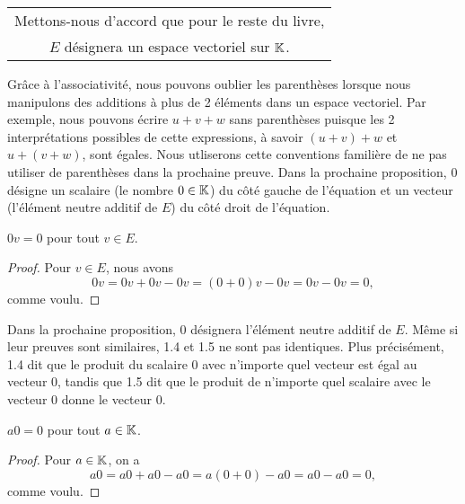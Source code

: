 \documentclass[12pt]{book}
\theoremstyle{plain}
\begin{document}
\begin{center}
    \begin{tabular}{|c|}
        \hline
        Mettons-nous d'accord que pour le reste du livre,   \\
        $E$ désignera un espace vectoriel sur $\mathbb{K}$.   \\
        \hline
    \end{tabular}
\end{center}

Grâce à l'associativité, nous pouvons oublier les parenthèses lorsque nous manipulons des additions à plus de 2 éléments dans un espace vectoriel. Par exemple, nous pouvons écrire $u+v+w$ sans parenthèses puisque les 2 interprétations possibles de cette expressions, à savoir $(u+v)+w$ et $u+(v+w)$, sont égales. Nous utliserons cette conventions familière de ne pas utiliser de parenthèses dans la prochaine preuve. Dans la prochaine proposition, 0 désigne un scalaire (le nombre $0\in\mathbb{K}$) du côté gauche de l'équation et un vecteur (l'élément neutre additif de $E$) du côté droit de l'équation.\\

\begin{prop}
    $0v=0$ pour tout $v\in E$.
    \begin{proof}
        Pour $v\in E$, nous avons
        \begin{equation*}
            0v=0v+0v-0v=(0+0)v-0v=0v-0v=0,
        \end{equation*}
        comme voulu.
    \end{proof}
\end{prop}

Dans la prochaine proposition, 0 désignera l'élément neutre additif de $E$. Même si leur preuves sont similaires, 1.4 et 1.5 ne sont pas identiques. Plus précisément, 1.4 dit que le produit du scalaire 0 avec n'importe quel vecteur est égal au vecteur 0, tandis que 1.5 dit que le produit de n'importe quel scalaire avec le vecteur 0 donne le vecteur 0.\\

\begin{prop}
    $a0=0$ pour tout $a\in\mathbb{K}$.
    \begin{proof}
        Pour $a\in\mathbb{K}$, on a
        \begin{equation*}
            a0=a0+a0-a0=a(0+0)-a0=a0-a0=0,
        \end{equation*}
        comme voulu.
    \end{proof}
\end{prop}
\end{document}
